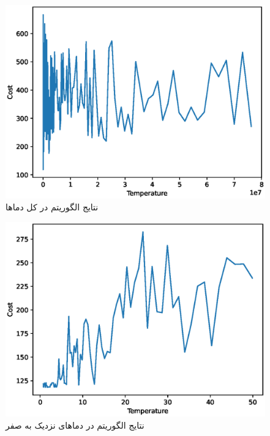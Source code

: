 \begin{figure}[H]
	\caption{نتایج الگوریتم  در کل دماها} 
	\centering 
	\includegraphics[width=12cm]{../Figure/Q3/all} 
\end{figure}

\begin{figure}[H]
	\caption{نتایج الگوریتم  در دماهای نزدیک به صفر} 
	\centering 
	\includegraphics[width=12cm]{../Figure/Q3/final} 
\end{figure}



